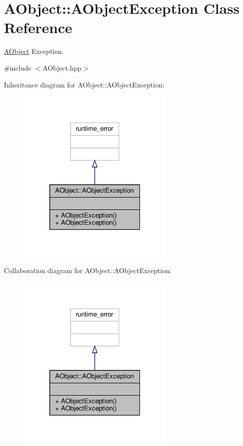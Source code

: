 \hypertarget{class_a_object_1_1_a_object_exception}{}\section{A\+Object\+:\+:A\+Object\+Exception Class Reference}
\label{class_a_object_1_1_a_object_exception}


\hyperlink{class_a_object}{A\+Object} Exception.  




{\ttfamily \#include $<$A\+Object.\+hpp$>$}



Inheritance diagram for A\+Object\+:\+:A\+Object\+Exception\+:
\nopagebreak
\begin{figure}[H]
\begin{center}
\leavevmode
\includegraphics[width=217pt]{class_a_object_1_1_a_object_exception__inherit__graph}
\end{center}
\end{figure}


Collaboration diagram for A\+Object\+:\+:A\+Object\+Exception\+:
\nopagebreak
\begin{figure}[H]
\begin{center}
\leavevmode
\includegraphics[width=217pt]{class_a_object_1_1_a_object_exception__coll__graph}
\end{center}
\end{figure}
